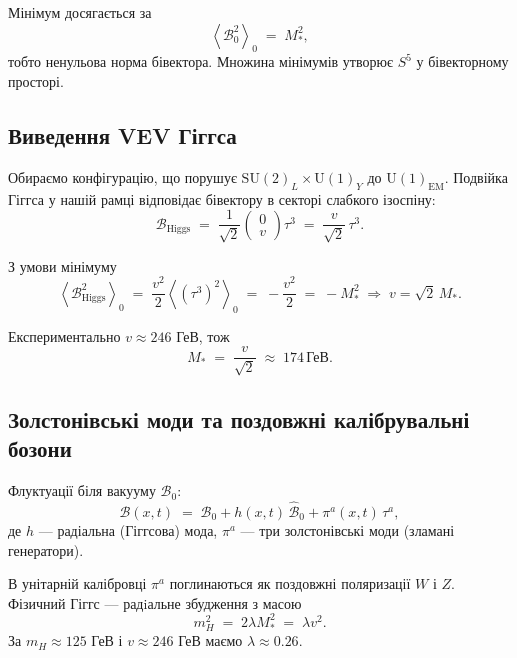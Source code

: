 \documentclass[11pt,a4paper]{article}
\newcommand{\grade}[2]{\left\langle #1 \right\rangle_{#2}}
\newcommand{\scal}[1]{\grade{#1}{0}}
\newcommand{\Biv}{\mathcal{B}}
\newcommand{\SU}{\mathrm{SU}}
\newcommand{\UU}{\mathrm{U}}
\theoremstyle{definition}
\theoremstyle{plain}
\theoremstyle{remark}
\begin{document}
Мінімум досягається за
\begin{equation}
  \scal{\Biv_0^2} \;=\; M_\ast^2,
\end{equation}
тобто ненульова норма бівектора. Множина мінімумів утворює $S^5$ у бівекторному просторі.

\subsection{Виведення VEV Гіггса}

Обираємо конфігурацію, що порушує $\SU(2)_L \times \UU(1)_Y$ до $\UU(1)_{\text{EM}}$. Подвійка Гіггса у нашій рамці відповідає бівектору в секторі слабкого ізоспіну:
\begin{equation}
  \Biv_{\text{Higgs}} \;=\; \frac{1}{\sqrt{2}}\begin{pmatrix} 0 \\ v \end{pmatrix} \tau^3
  \;=\; \frac{v}{\sqrt{2}}\,\tau^3.
\end{equation}

З умови мінімуму
\begin{equation}
  \scal{\Biv_{\text{Higgs}}^2}
  \;=\; \frac{v^2}{2}\scal{(\tau^3)^2}
  \;=\; -\frac{v^2}{2}
  \;=\; -M_\ast^2
  \;\Rightarrow\;
  v = \sqrt{2}\,M_\ast.
\end{equation}

Експериментально $v \approx 246$ ГеВ, тож
\begin{equation}
  \boxed{M_\ast \;=\; \frac{v}{\sqrt{2}} \;\approx\; 174\,\text{ГеВ}.}
\end{equation}

\subsection{Золстонівські моди та поздовжні калібрувальні бозони}

Флуктуації біля вакууму $\Biv_0$:
\begin{equation}
  \Biv(x,t) \;=\; \Biv_0 + h(x,t)\,\hat{\Biv}_0 + \pi^a(x,t)\,\tau^a,
\end{equation}
де $h$ — радіальна (Гіггсова) мода, $\pi^a$ — три золстонівські моди (зламані генератори).

В унітарній калібровці $\pi^a$ поглинаються як поздовжні поляризації $W$ і $Z$. Фізичний Гіггс — радiальне збудження з масою
\begin{equation}
  m_H^2 \;=\; 2\lambda M_\ast^2 \;=\; \lambda v^2.
\end{equation}
За $m_H \approx 125$ ГеВ і $v \approx 246$ ГеВ маємо $\lambda \approx 0{.}26$.
\end{document}
